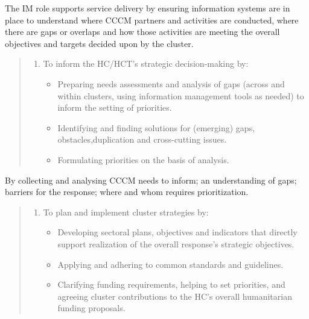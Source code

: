 \documentclass[
  a4paper,
  onecolumn,
  oneside]{book}
\providecommand{\tightlist}{%
  \setlength{\itemsep}{0pt}\setlength{\parskip}{0pt}}\usepackage{longtable,booktabs,array}
\begin{document}
The IM role supports service delivery by ensuring information systems
are in place to understand where CCCM partners and activities are
conducted, where there are gaps or overlaps and how those activities are
meeting the overall objectives and targets decided upon by the cluster.

\begin{quote}
\begin{enumerate}
\def\labelenumi{\arabic{enumi}.}
\setcounter{enumi}{1}
\tightlist
\item
  To inform the HC/HCT's strategic decision-making by:

  \begin{itemize}
  \tightlist
  \item
    Preparing needs assessments and analysis of gaps (across and within
    clusters, using information management tools as needed) to inform
    the setting of priorities.
  \item
    Identifying and finding solutions for (emerging) gaps,
    obstacles,duplication and cross-cutting issues.
  \item
    Formulating priorities on the basis of analysis.
  \end{itemize}
\end{enumerate}
\end{quote}

By collecting and analysing CCCM needs to inform; an understanding of
gaps; barriers for the response; where and whom requires prioritization.

\begin{quote}
\begin{enumerate}
\def\labelenumi{\arabic{enumi}.}
\setcounter{enumi}{2}
\tightlist
\item
  To plan and implement cluster strategies by:

  \begin{itemize}
  \tightlist
  \item
    Developing sectoral plans, objectives and indicators that directly
    support realization of the overall response's strategic objectives.
  \item
    Applying and adhering to common standards and guidelines.
  \item
    Clarifying funding requirements, helping to set priorities, and
    agreeing cluster contributions to the HC's overall humanitarian
    funding proposals.
  \end{itemize}
\end{enumerate}
\end{quote}
\end{document}
